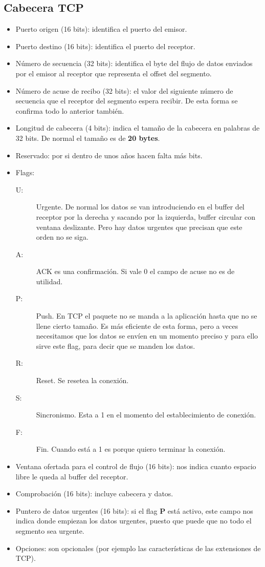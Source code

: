 \subsection{Cabecera TCP}
\begin{itemize}
    \item Puerto origen (16 bits): identifica el puerto del emisor.
    \item Puerto destino (16 bits): identifica el puerto del receptor.
    \item Número de secuencia (32 bits): identifica el byte del flujo de datos enviados por el emisor al receptor que representa el offset del segmento.
    \item Número de acuse de recibo (32 bits): el valor del siguiente número de secuencia que el receptor del segmento espera recibir. De esta forma se confirma todo lo anterior también.
    \item Longitud de cabecera (4 bits): indica el tamaño de la cabecera en palabras de 32 bits. De normal el tamaño es de \textbf{20 bytes}.
    \item Reservado: por si dentro de unos años hacen falta más bits.
    \item Flags:
        \begin{description}
            \item [U:] Urgente. De normal los datos se van introduciendo en el buffer del receptor por la derecha y sacando por la izquierda, buffer circular con ventana deslizante. Pero hay datos urgentes que precisan que este orden no se siga. 
            \item [A:] ACK es una confirmación. Si vale 0 el campo de acuse no es de utilidad.
            \item [P:] Push. En TCP el paquete no se manda a la aplicación hasta que no se llene cierto tamaño. Es más eficiente de esta forma, pero a veces necesitamos que los datos se envíen en un momento preciso y para ello sirve este flag, para decir que se manden los datos.
            \item [R:] Reset. Se resetea la conexión.
            \item [S:] Sincronismo. Esta a 1 en el momento del establecimiento de conexión.
            \item [F:] Fin. Cuando está a 1 es porque quiero terminar la conexión. 
        \end{description}
    \item Ventana ofertada para el control de flujo (16 bits): nos indica cuanto espacio libre le queda al buffer del receptor. 
    \item Comprobación (16 bits): incluye cabecera y datos. 
    \item Puntero de datos urgentes (16 bits): si el flag \textbf{P} está activo, este campo nos indica donde empiezan los datos urgentes, puesto que puede que no todo el segmento sea urgente.
    \item Opciones: son opcionales (por ejemplo las características de las extensiones de TCP).
\end{itemize}

